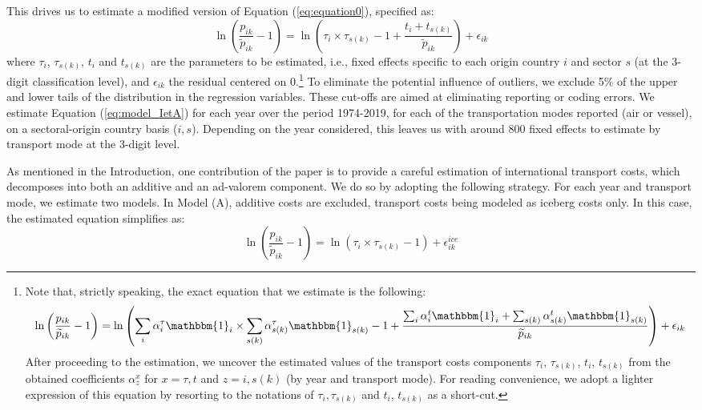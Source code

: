 \documentclass[a4paper,11pt]{article}
\begin{document}
This drives us to estimate a modified version of Equation (\ref{eq:equation0}), specified as:
\begin{equation}
\ln\left(\frac{p_{ik}}{\widetilde{p}_{ik}}-1 \right)= \ln \left(\tau_{i}\times \tau_{s(k)} -1+\frac{t_{i} + t_{s(k)}}{\widetilde{p}_{ik}} \right) + \epsilon_{ik} \label{eq:model_IetA}
\end{equation}
where $\tau_{i}$, $\tau_{s(k)}$, $t_{i}$ and $t_{s(k)}$ are the parameters to be estimated, i.e., fixed effects specific to each origin country $i$ and sector $s$ (at the 3-digit classification level), and $\epsilon_{ik}$ the residual centered on 0.\footnote{Note that, strictly speaking, the exact equation that we estimate is the following:
$$\ln\left(\frac{p_{ik}}{\widetilde{p}_{ik}}-1 \right)= \ln \left(\sum_i \alpha_i^\tau \mathbbm{1}_i \times \sum_{s(k)}\alpha_{s(k)}^\tau \mathbbm{1}_{s(k)}-1 + \frac{\sum_i\alpha_i^t\mathbbm{1}_i + \sum_{s(k)}\alpha^t_{s(k)}\mathbbm{1}_{s(k)}}{\widetilde{p}_{ik}}\right)+\epsilon_{ik} $$
After proceeding to the estimation, we uncover the estimated values of the transport costs components $\tau_{i}$, $\tau_{s(k)}$, $t_{i}$, $t_{s(k)}$ from the obtained coefficients $\alpha^{x}_{z}$ for $x=\tau,t$ and $z=i,s(k)$ (by year and transport mode).
For reading convenience, we adopt a lighter expression of this equation by resorting to the notations of $\tau_i,\tau_{s(k)}$ and $t_i$, $t_{s(k)}$ as a short-cut.}  To eliminate the potential influence of outliers, we exclude 5\% of the upper and lower tails of the distribution in the regression variables.
These cut-offs are aimed at eliminating reporting or coding errors.
We estimate Equation (\ref{eq:model_IetA}) for each year over the period 1974-2019, for each of the transportation modes reported (air or vessel), on a sectoral-origin country basis ($i,s$).
Depending on the year considered, this leaves us with around 800 fixed effects to estimate by transport mode at the 3-digit level.
  \medskip

As mentioned in the Introduction, one contribution of the paper is to provide a careful estimation of international transport costs, which decomposes into both an additive and an ad-valorem component. We do so by adopting the following strategy. For each year and transport mode, we estimate two models. In Model (A), additive costs are excluded, transport costs being modeled as iceberg costs only. In this case, the estimated equation simplifies as:
\begin{equation}
\ln\left(\frac{p_{ik}}{\widetilde{p}_{ik}}-1 \right)= \ln \left(\tau_{i}\times\tau_{s(k)}-1 \right) + \epsilon^{ice}_{ik} \label{eq:model_nlI}
\end{equation}
\end{document}
